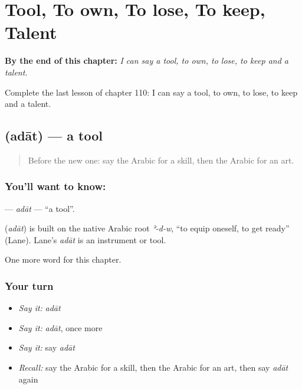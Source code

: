 
\chapter{Tool, To own, To lose, To keep, Talent}
\label{ch:ar-tool-to-own-to-lose-to-keep-talent}

\begin{chapteropening}
\textbf{By the end of this chapter:} \emph{I can say a tool, to own, to lose, to keep and a talent.}

Complete the last lesson of chapter 110: I can say a tool, to own, to lose, to keep and a talent.
\end{chapteropening}

\section[\texorpdfstring{\ar{أداة} (adāt)}{أداة (adāt)}]{ (adāt) — a tool}

\label{lesson:AR-C110-adat}



\begin{quote}
Before the new one: say the Arabic for a skill, then the Arabic for an art.
\end{quote}

\subsection*{You'll want to know: }
\textbf{} — \emph{adāt} — \textquotedblleft{}a tool\textquotedblright{}.

\begin{cousinweb}
\textbf{} (\emph{adāt}) is built on the native Arabic root \emph{ʾ-d-w}, \textquotedblleft{}to equip oneself, to get ready\textquotedblright{} (Lane). Lane's \emph{adāt} is an instrument or tool.
\end{cousinweb}

\begin{grammarlens}[title={What you've built}]
One more word for this chapter.
\end{grammarlens}

\subsection*{Your turn}
\begin{itemize}
\raggedright
  \item \emph{Say it:} \emph{adāt}
  \item \emph{Say it:} \emph{adāt}, once more
  \item \emph{Say it:} say \emph{adāt}
  \item \emph{Recall:} say the Arabic for a skill, then the Arabic for an art, then say \emph{adāt} again
\end{itemize}


